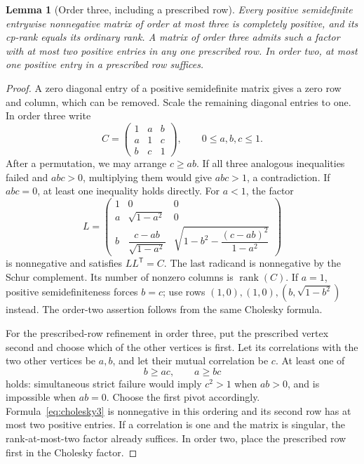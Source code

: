 \documentclass[11pt,a4paper]{article}
\newtheorem{lemma}[theorem]{Lemma}
\theoremstyle{definition}
\DeclareMathOperator{\rank}{rank}
\newcommand{\T}{\mathsf T}
\begin{document}
\begin{lemma}[Order three, including a prescribed row]\label{lem:three}
Every positive semidefinite entrywise nonnegative matrix of order at most three is completely positive, and its cp-rank equals its ordinary rank. A matrix of order three admits such a factor with at most two positive entries in any one prescribed row. In order two, at most one positive entry in a prescribed row suffices.
\end{lemma}
\begin{proof}
A zero diagonal entry of a positive semidefinite matrix gives a zero row and column, which can be removed. Scale the remaining diagonal entries to one. In order three write
\[
 C=\begin{pmatrix}1&a&b\\a&1&c\\b&c&1\end{pmatrix},\qquad 0\leq a,b,c\leq1.
\]
After a permutation, we may arrange $c\geq ab$. If all three analogous inequalities failed and $abc>0$, multiplying them would give $abc>1$, a contradiction. If $abc=0$, at least one inequality holds directly. For $a<1$, the factor
\begin{equation}\label{eq:cholesky3}
 L=\begin{pmatrix}
 1&0&0\\
 a&\sqrt{1-a^2}&0\\
 b&\dfrac{c-ab}{\sqrt{1-a^2}}&
 \sqrt{1-b^2-\dfrac{(c-ab)^2}{1-a^2}}
 \end{pmatrix}
\end{equation}
is nonnegative and satisfies $LL^{\T}=C$. The last radicand is nonnegative by the Schur complement. Its number of nonzero columns is $\rank(C)$. If $a=1$, positive semidefiniteness forces $b=c$; use rows $(1,0),(1,0),(b,\sqrt{1-b^2})$ instead. The order-two assertion follows from the same Cholesky formula.

For the prescribed-row refinement in order three, put the prescribed vertex second and choose which of the other vertices is first. Let its correlations with the two other vertices be $a,b$, and let their mutual correlation be $c$. At least one of
\[
 b\geq ac,\qquad a\geq bc
\]
holds: simultaneous strict failure would imply $c^2>1$ when $ab>0$, and is impossible when $ab=0$. Choose the first pivot accordingly. Formula~\eqref{eq:cholesky3} is nonnegative in this ordering and its second row has at most two positive entries. If a correlation is one and the matrix is singular, the rank-at-most-two factor already suffices. In order two, place the prescribed row first in the Cholesky factor.
\end{proof}
\end{document}
